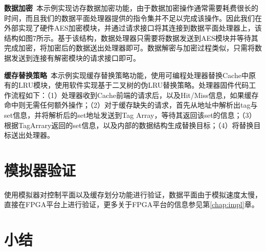 \textbf{数据加密}\ 本示例实现访存数据加密功能，由于数据加密操作通常需要耗费很长的时间，而且我们的数据平面处理器提供的指令集并不足以完成该操作。因此我们在外部实现了硬件AES加密模块，并通过请求接口将其连接到数据平面处理器上，该结构如图7所示。基于该结构，数据处理器只需要将数据发送到AES模块并等待其完成加密，将加密后的数据送出处理器即可。数据解密与加密过程类似，只需将数据发送到连接有解密模块的请求接口即可。
 
\textbf{缓存替换策略}\ 本示例实现缓存替换策略功能，使用可编程处理器替换Cache中原有的LRU模块，使用软件实现基于二叉树的伪LRU替换策略。处理器固件代码工作流程如下：（1）处理器收到Cache前端的请求后，以及Hit/Miss信息，如果缓存命中则无需任何额外操作；（2）对于缓存缺失的请求，首先从地址中解析出tag与set信息，并将解析后的set地址发送到Tag Array，等待其返回该set的信息；（3）根据TagArrary返回的set信息，以及内部的数据结构生成替换目标；（4）将替换目标送出处理器。


\section{模拟器验证}

使用模拟器对控制平面以及缓存划分功能进行验证，数据平面由于模拟速度太慢，直接在FPGA平台上进行验证，更多关于FPGA平台的信息参见第\ref{chap:impl}章。


\section{小结}

